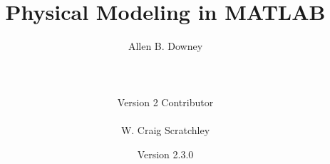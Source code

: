 \documentclass[
]{book}
\numberwithin{Answer}{chapter}
\numberwithin{Exercise}{chapter}
\newcommand{\myreg}{\textsuperscript{{\tiny \textregistered}}}
\newcommand{\thetitle}{Physical Modeling in MATLAB\myreg}
\newcommand{\theversion}{2.3.0}
\begin{document}
\frontmatter

\title {\thetitle}
\author {Allen B. Downey\\
\\
\\
\\
Version 2 Contributor\\
\\
W. Craig Scratchley\\}
\date {Version \theversion}

\sloppy




\setlength{\headsep}{3ex}
\setlength{\parindent}{0.0in}
\setlength{\parskip}{1.7ex plus 0.5ex minus 0.5ex}
\renewcommand{\baselinestretch}{1.02}

\setlength{\topsep}{-0.0\parskip}
\setlength{\partopsep}{-0.5\parskip}
\setlength{\itemindent}{0.0in}
\setlength{\listparindent}{0.0in}



\makeatletter     %

\renewcommand{\section}{\@startsection
    {section} {1} {0mm}%
    {-3.5ex \@plus -1ex \@minus -.2ex}%
    {0.7ex \@plus.2ex}%
    {\normalfont\Large\bfseries}}
\renewcommand\subsection{\@startsection {subsection}{2}{0mm}%
    {-3.25ex\@plus -1ex \@minus -.2ex}%
    {0.3ex \@plus .2ex}%
    {\normalfont\large\bfseries}}
\renewcommand\subsubsection{\@startsection {subsubsection}{3}{0mm}%
    {-3.25ex\@plus -1ex \@minus -.2ex}%
    {0.3ex \@plus .2ex}%
    {\normalfont\normalsize\bfseries}}
\end{document}
